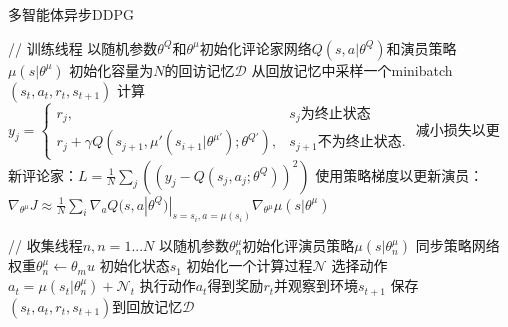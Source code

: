 \begin{algorithm}[ht]
\caption{多智能体异步DDPG}
\label{amalgorithm}
\begin{algorithmic}[1]

\State // 训练线程
\State 以随机参数$\theta^Q$和$\theta^\mu$初始化评论家网络$Q(s,a|\theta^Q)$和演员策略$\mu(s|\theta^\mu)$
\State 初始化容量为$N$的回访记忆$\mathcal{D}$
    \State 从回放记忆中采样一个minibatch$(s_t, a_t, r_t, s_{t+1})$
    \State 计算$y_j = \begin{cases} r_j,  & \text{$s_j$为终止状态} \\ r_j + \gamma Q(s_{j+1}, \mu'(s_{i+1}|\theta^{\mu'}); \theta^{Q'}), & \text{$s_{j+1}$不为终止状态}. \end{cases}$
    \State 减小损失以更新评论家：$L = \frac{1}{N}\sum_j ((y_j - Q(s_j, a_j; \theta^Q))^2)$
    \State 使用策略梯度以更新演员：$\nabla_{\theta^\mu} J \approx \frac{1}{N} \sum_i \nabla_a Q(s,a|\theta^Q)|_{s=s_i,a=\mu(s_i)} \nabla_{\theta^\mu} \mu(s|\theta^\mu)$
\EndFor

\State // 收集线程$n, n=1...N$
\State 以随机参数$\theta^\mu_n$初始化评演员策略$\mu(s|\theta^\mu_n)$
    \State 同步策略网络权重$\theta^\mu_n \leftarrow \theta_mu$
    \State 初始化状态$s_1$
    \State 初始化一个计算过程$\mathcal{N}$
        \State 选择动作$a_t = \mu(s_t|\theta^\mu_n) + \mathcal{N}_t$
        \State 执行动作$a_t$得到奖励$r_t$并观察到环境$s_{t+1}$
        \State 保存$(s_t, a_t, r_t, s_{t+1})$到回放记忆$\mathcal{D}$
    \EndFor
\EndFor

\end{algorithmic}
\end{algorithm}
